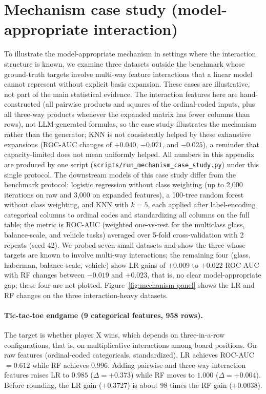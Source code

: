 \section{Mechanism case study (model-appropriate interaction)}\label{app:mechanism}

To illustrate the model-appropriate mechanism in settings where the interaction structure is known, we examine three datasets outside the benchmark whose ground-truth targets involve multi-way feature interactions that a linear model cannot represent without explicit basis expansion. These cases are illustrative, not part of the main statistical evidence. The interaction features here are hand-constructed (all pairwise products and squares of the ordinal-coded inputs, plus all three-way products whenever the expanded matrix has fewer columns than rows), not LLM-generated formulas, so the case study illustrates the mechanism rather than the generator; KNN is not consistently helped by these exhaustive expansions (ROC-AUC changes of \(+0.040\), \(-0.071\), and \(-0.025\)), a reminder that capacity-limited does not mean uniformly helped. All numbers in this appendix are produced by one script (\texttt{scripts/run\_mechanism\_case\_study.py}) under this single protocol. The downstream models of this case study differ from the benchmark protocol: logistic regression without class weighting (up to 2,000 iterations on raw and 3,000 on expanded features), a 100-tree random forest without class weighting, and KNN with \(k = 5\), each applied after label-encoding categorical columns to ordinal codes and standardizing all columns on the full table; the metric is ROC-AUC (weighted one-vs-rest for the multiclass glass, balance-scale, and vehicle tasks) averaged over 5-fold cross-validation with 2 repeats (seed 42). We probed seven small datasets and show the three whose targets are known to involve multi-way interactions; the remaining four (glass, haberman, balance-scale, vehicle) show LR gains of \(+0.009\) to \(+0.022\) ROC-AUC with RF changes between \(-0.019\) and \(+0.023\), that is, no clear model-appropriate gap; these four are not plotted. Figure~\ref{fig:mechanism-panel} shows the LR and RF changes on the three interaction-heavy datasets.

\paragraph{Tic-tac-toe endgame (9 categorical features, 958 rows).}

The target is whether player X wins, which depends on three-in-a-row configurations, that is, on multiplicative interactions among board positions. On raw features (ordinal-coded categoricals, standardized), LR achieves ROC-AUC \(= 0.612\) while RF achieves \(0.996\). Adding pairwise and three-way interaction features raises LR to \(0.985\) (\(\Delta = +0.373\)) while RF moves to \(1.000\) (\(\Delta = +0.004\)). Before rounding, the LR gain (\(+0.3727\)) is about 98 times the RF gain (\(+0.0038\)).

